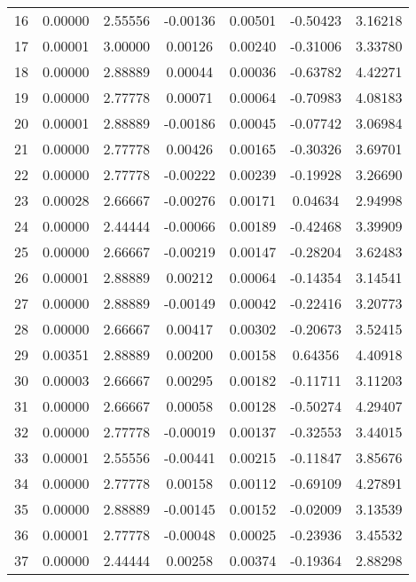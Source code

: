 \begin{longtable}{c c c c c c c}
16  &  0.00000 &      2.55556 & -0.00136 &   0.00501 &  -0.50423 &   3.16218 \\
17  &  0.00001 &      3.00000 &  0.00126 &   0.00240 &  -0.31006 &   3.33780 \\
18  &  0.00000 &      2.88889 &  0.00044 &   0.00036 &  -0.63782 &   4.42271 \\
19  &  0.00000 &      2.77778 &  0.00071 &   0.00064 &  -0.70983 &   4.08183 \\
20  &  0.00001 &      2.88889 & -0.00186 &   0.00045 &  -0.07742 &   3.06984 \\
21  &  0.00000 &      2.77778 &  0.00426 &   0.00165 &  -0.30326 &   3.69701 \\
22  &  0.00000 &      2.77778 & -0.00222 &   0.00239 &  -0.19928 &   3.26690 \\
23  &  0.00028 &      2.66667 & -0.00276 &   0.00171 &   0.04634 &   2.94998 \\
24  &  0.00000 &      2.44444 & -0.00066 &   0.00189 &  -0.42468 &   3.39909 \\
25  &  0.00000 &      2.66667 & -0.00219 &   0.00147 &  -0.28204 &   3.62483 \\
26  &  0.00001 &      2.88889 &  0.00212 &   0.00064 &  -0.14354 &   3.14541 \\
27  &  0.00000 &      2.88889 & -0.00149 &   0.00042 &  -0.22416 &   3.20773 \\
28  &  0.00000 &      2.66667 &  0.00417 &   0.00302 &  -0.20673 &   3.52415 \\
29  &  0.00351 &      2.88889 &  0.00200 &   0.00158 &   0.64356 &   4.40918 \\
30  &  0.00003 &      2.66667 &  0.00295 &   0.00182 &  -0.11711 &   3.11203 \\
31  &  0.00000 &      2.66667 &  0.00058 &   0.00128 &  -0.50274 &   4.29407 \\
32  &  0.00000 &      2.77778 & -0.00019 &   0.00137 &  -0.32553 &   3.44015 \\
33  &  0.00001 &      2.55556 & -0.00441 &   0.00215 &  -0.11847 &   3.85676 \\
34  &  0.00000 &      2.77778 &  0.00158 &   0.00112 &  -0.69109 &   4.27891 \\
35  &  0.00000 &      2.88889 & -0.00145 &   0.00152 &  -0.02009 &   3.13539 \\
36  &  0.00001 &      2.77778 & -0.00048 &   0.00025 &  -0.23936 &   3.45532 \\
37  &  0.00000 &      2.44444 &  0.00258 &   0.00374 &  -0.19364 &   2.88298 \\

\end{longtable}
